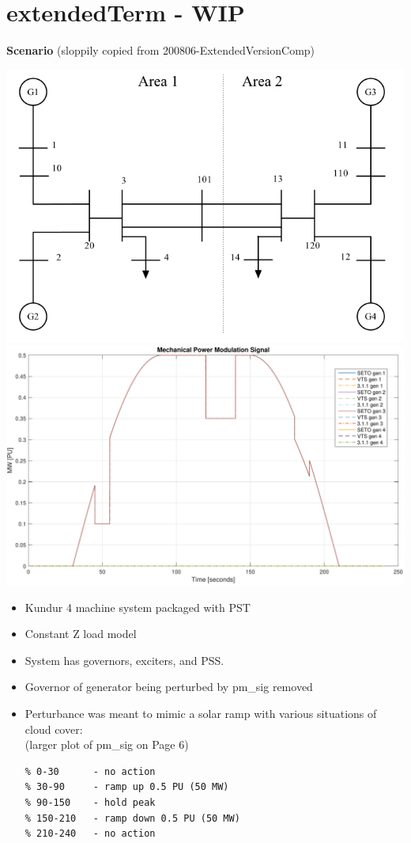 \section{extendedTerm - WIP}

\textbf{Scenario} (sloppily copied from 200806-ExtendedVersionComp)
 \begin{center}
\begin{minipage}{.47\linewidth}
\centering
\includegraphics[width=\linewidth]{examples/extendedTerm/sysOneLineAreas}
\includegraphics[width=.8\linewidth]{examples/extendedTerm/verPmSig}
\end{minipage} %
\begin{minipage}{.47\linewidth}
\begin{itemize}
\footnotesize
\itemsep 0em
\item Kundur  4 machine system packaged with PST
\item Constant Z load model
\item System has governors, exciters, and PSS.
\item Governor of generator being perturbed by pm\_sig removed
\item Perturbance was meant to mimic a solar ramp with various situations of cloud cover:\\
(larger plot of pm\_sig on Page 6)
\begin{Verbatim}[fontsize=\scriptsize]
% time [seconds]
% 0-30      - no action
% 30-90     - ramp up 0.5 PU (50 MW)
% 90-150    - hold peak
% 150-210   - ramp down 0.5 PU (50 MW)
% 210-240   - no action


\end{Verbatim}
\end{itemize}
\end{minipage}
\end{center}
